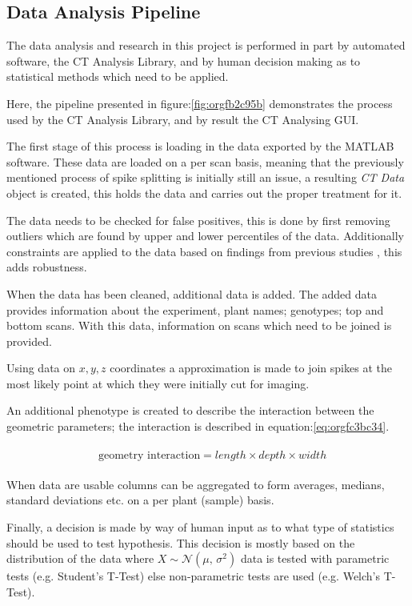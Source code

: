 \documentclass[11pt]{report}
\begin{document}
\subsection{Data Analysis Pipeline}
\label{sec:org73011a0}
The data analysis and research in this project is performed in part by automated software, the CT Analysis Library, and by human decision making as to statistical methods which need to be applied.

Here, the pipeline presented in figure:\ref{fig:orgfb2c95b} demonstrates the process used by the CT Analysis Library, and by result the CT Analysing GUI.

The first stage of this process is loading in the data exported by the MATLAB software. These data are loaded on a per scan basis, meaning that the previously mentioned process of spike splitting is initially still an issue, a resulting \emph{CT Data} object is created, this holds the data and carries out the proper treatment for it.

The data needs to be checked for false positives, this is done by first removing outliers which are found by upper and lower percentiles of the data. Additionally constraints are applied to the data based on findings from previous studies \cite{Hughes2017}, this adds robustness.

When the data has been cleaned, additional data is added. The added data provides information about the experiment, plant names; genotypes; top and bottom scans. With this data, information on scans which need to be joined is provided.

Using data on \(x,y,z\) coordinates a approximation is made to join spikes at the most likely point at which they were initially cut for imaging.

An additional phenotype is created to describe the interaction between the geometric parameters; the interaction is described in equation:\ref{eq:orgfc3bc34}.

 \begin{align}
\label{eq:orgfc3bc34}
   &\begin{aligned}
\text{geometry interaction} = length \times depth \times width
   \end{aligned}
 \end{align}

When data are usable columns can be aggregated to form averages, medians, standard deviations etc. on a per plant (sample) basis.

Finally, a decision is made by way of human input as to what type of statistics should be used to test hypothesis. This decision is mostly based on the distribution of the data where \(X \sim \mathcal{N}(\mu,\,\sigma^{2})\) data is tested with parametric tests (e.g. Student's T-Test) else non-parametric tests are used (e.g. Welch's T-Test).
\end{document}
